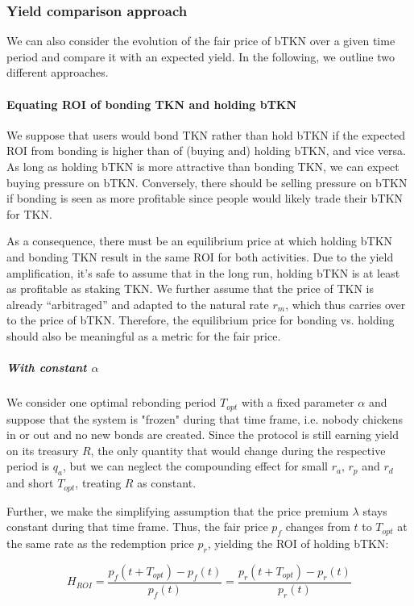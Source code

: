 \documentclass{article}
\begin{document}
\subsubsection{Yield comparison approach}
We can also consider the evolution of the fair price of bTKN over a given time period and compare it with an expected yield. In the following, we outline two different approaches.

\paragraph{Equating ROI of bonding TKN and holding bTKN}
We suppose that users would bond TKN rather than hold bTKN if the expected ROI from bonding is higher than of (buying and) holding bTKN, and vice versa. As long as holding bTKN is more attractive than bonding TKN, we can expect buying pressure on bTKN. Conversely, there should be selling pressure on bTKN if bonding is seen as more profitable since people would likely trade their bTKN for TKN. 

As a consequence, there must be an equilibrium price at which holding bTKN and bonding TKN result in the same ROI for both activities. Due to the yield amplification, it's safe to assume that in the long run, holding bTKN is at least as profitable as staking TKN. We further assume that the price of TKN is already “arbitraged” and adapted to the natural rate $r_m$, which thus carries over to the price of bTKN. Therefore, the equilibrium price for bonding vs. holding should also be meaningful as a metric for the fair price.

\subparagraph{With constant $\alpha$}
We consider one optimal rebonding period $T_{opt}$ with a fixed parameter $\alpha$ and suppose that the system is "frozen" during that time frame, i.e. nobody chickens in or out and no new bonds are created. Since the protocol is still earning yield on its treasury $R$, the only quantity that would change during the respective period is $q_a$, but we can neglect the compounding effect for small $r_a$, $r_p$ and $r_d$ and short $T_{opt}$, treating $R$ as constant.

Further, we make the simplifying assumption that the price premium $\lambda$ stays constant during that time frame. Thus, the fair price $p_f$ changes from $t$ to $T_{opt}$ at the same rate as the redemption price $p_r$, yielding the ROI of holding bTKN:

\begin{equation}
  \label{eq:ROI-eq}
  H_{ROI} = \frac{p_f(t + T_{opt}) - p_f(t)}{p_f(t)} = \frac{p_r(t + T_{opt}) - p_r(t)}{p_r(t)}
\end{equation}
\end{document}

